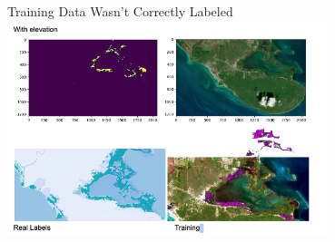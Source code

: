 




\begin{frame}{Training Data Wasn't Correctly Labeled}
    \centering
    \includegraphics[height=0.7\textheight,width=0.7\textwidth,keepaspectratio]{images/elev.png}
\end{frame}

